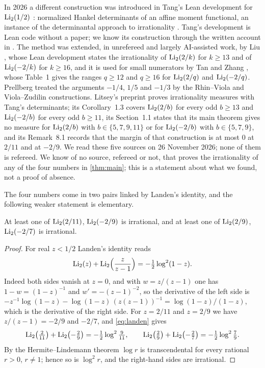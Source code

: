 In 2026 a different construction was introduced in Tang's Lean development for $\operatorname{Li}_2(1/2)$ \cite{TangLi2Half}: normalized Hankel determinants of an affine moment functional, an instance of the determinantal approach to irrationality \cite{Zudilin2017}. Tang's development is Lean code without a paper; we know its construction through the written account in \cite[Sections~2 and~9]{Litsey2026Li2}. The method was extended, in unrefereed and largely AI-assisted work, by Liu \cite{LiuLi2Rational}, whose Lean development states the irrationality of $\operatorname{Li}_2(2/k)$ for $k\ge13$ and of $\operatorname{Li}_2(-2/k)$ for $k\ge16$, and it is used for small numerators by Tan and Zhang \cite{TanZhang2026}, whose Table~1 gives the ranges $q\ge12$ and $q\ge16$ for $\operatorname{Li}_2(2/q)$ and $\operatorname{Li}_2(-2/q)$. Prellberg \cite{Prellberg2026} treated the arguments $-1/4$, $1/5$ and $-1/3$ by the Rhin--Viola and Viola--Zudilin constructions. Litsey's preprint \cite{Litsey2026Li2} proves irrationality measures with Tang's determinants; its Corollary~1.3 covers $\operatorname{Li}_2(2/b)$ for every odd $b\ge13$ and $\operatorname{Li}_2(-2/b)$ for every odd $b\ge11$, its Section~1.1 states that its main theorem gives no measure for $\operatorname{Li}_2(2/b)$ with $b\in\{5,7,9,11\}$ or for $\operatorname{Li}_2(-2/b)$ with $b\in\{5,7,9\}$, and its Remark~8.1 records that the margin of that construction is at most $0$ at $2/11$ and at $-2/9$. We read these five sources on 26 November 2026; none of them is refereed. We know of no source, refereed or not, that proves the irrationality of any of the four numbers in \cref{thm:main}; this is a statement about what we found, not a proof of absence.

The four numbers come in two pairs linked by Landen's identity, and the following weaker statement is elementary.

\begin{proposition}\label{prop:landen}
At least one of $\operatorname{Li}_2(2/11)$, $\operatorname{Li}_2(-2/9)$ is irrational, and at least one of $\operatorname{Li}_2(2/9)$, $\operatorname{Li}_2(-2/7)$ is irrational.
\end{proposition}

\begin{proof}
For real $z<1/2$ Landen's identity reads
\begin{equation}\label{eq:landen}
\operatorname{Li}_2(z)+\operatorname{Li}_2\Bigl(\frac{z}{z-1}\Bigr)=-\tfrac12\log^2(1-z).
\end{equation}
Indeed both sides vanish at $z=0$, and with $w=z/(z-1)$ one has $1-w=(1-z)^{-1}$ and $w'=-(z-1)^{-2}$, so the derivative of the left side is
$-z^{-1}\log(1-z)-\log(1-z)\,(z(z-1))^{-1}=\log(1-z)/(1-z)$, which is the derivative of the right side. For $z=2/11$ and $z=2/9$ we have $z/(z-1)=-2/9$ and $-2/7$, and \eqref{eq:landen} gives
\[
\operatorname{Li}_2\bigl(\tfrac2{11}\bigr)+\operatorname{Li}_2\bigl(-\tfrac29\bigr)=-\tfrac12\log^2\tfrac9{11},\qquad
\operatorname{Li}_2\bigl(\tfrac29\bigr)+\operatorname{Li}_2\bigl(-\tfrac27\bigr)=-\tfrac12\log^2\tfrac79 .
\]
By the Hermite--Lindemann theorem $\log r$ is transcendental for every rational $r>0$, $r\ne1$; hence so is $\log^2 r$, and the right-hand sides are irrational.
\end{proof}

